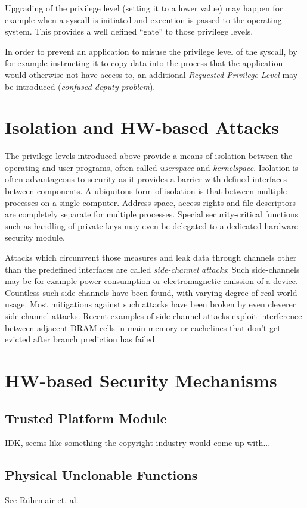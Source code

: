 Upgrading of the privilege level (setting it to a lower value) may happen for
example when a syscall is initiated and execution is passed to the operating
system. This provides a well defined ``gate'' to those privilege levels.

In order to prevent an application to misuse the privilege level of the syscall,
by for example instructing it to copy data into the process that the application
would otherwise not have access to, an additional \textit{Requested Privilege
Level} may be introduced (\emph{confused deputy problem}).

\section{Isolation and HW-based Attacks}
The privilege levels introduced above provide a means of isolation between the
operating and user programs, often called \textit{userspace} and
\textit{kernelspace}. Isolation is often advantageous to security as it provides
a barrier with defined interfaces between components. A ubiquitous form of
isolation is that between multiple processes on a single computer. Address
space, access rights and file descriptors are completely separate for multiple
processes. Special security-critical functions such as handling of private keys
may even be delegated to a dedicated hardware security module.

Attacks which circumvent those measures and leak data through channels other
than the predefined interfaces are called \emph{side-channel attacks}: Such
side-channels may be for example power consumption or electromagnetic emission
of a device. Countless such side-channels have been found, with varying degree
of real-world usage. Most mitigations against such attacks have been broken by
even cleverer side-channel attacks. Recent examples of side-channel attacks
exploit interference between adjacent DRAM cells in main memory or cachelines
that don't get evicted after branch prediction has failed.

\section{HW-based Security Mechanisms}
\subsection{Trusted Platform Module}
IDK, seems like something the copyright-industry would come up with...

\subsection{Physical Unclonable Functions}
See Rührmair et. al.